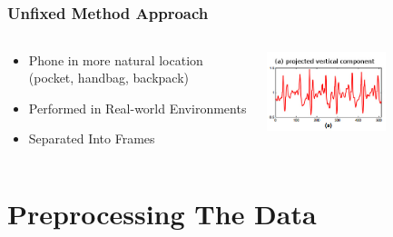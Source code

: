 \documentclass{beamer}
\begin{document}
\subsection{}
\begin{frame}
  \frametitle{Unfixed Method Approach}

  \begin{columns}
  \begin{column}{0.6\textwidth}
  \begin{itemize}
    \item Phone in more natural location (pocket, handbag, backpack)
  	\linebreak
  	\item Performed in Real-world Environments
  	\linebreak
  	\item Separated Into Frames
  \end{itemize}
  \end{column}
  \begin{column}{0.7\textwidth}
   \includegraphics[width=0.6\textwidth]{Illustrations/frame.jpg}
  \end{column}
  \end{columns}
\end{frame}





\section[Preprocessing the data]{Preprocessing The Data}
\end{document}
